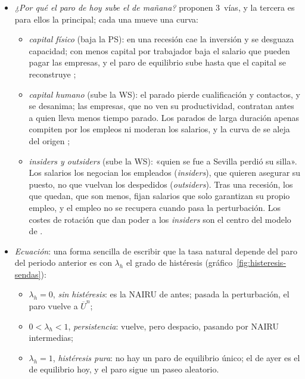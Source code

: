 \documentclass[11pt]{article}
\begin{document}
\begin{itemize}
\item \emph{¿Por qué el paro de hoy sube el de mañana?} \textcite{BlanchardSummers1986Hysteresis} proponen 3~vías, y la tercera es para ellos la principal; cada una mueve una curva:
  \begin{itemize}
  \item \emph{capital físico} (baja la PS): en una recesión cae la inversión y se desguaza capacidad; con menos capital por trabajador baja el salario que pueden pagar las empresas, y el paro de equilibrio sube hasta que el capital se reconstruye ;
  \item \emph{capital humano} (sube la WS): el parado pierde cualificación y contactos, y se desanima; las empresas, que no ven su productividad, contratan antes a quien lleva menos tiempo parado\nocite{BlanchardDiamond1994Ranking}. Los parados de larga duración apenas compiten por los empleos ni moderan los salarios, y la curva de  se aleja del origen ;
  \item \emph{insiders y outsiders} (sube la WS): «quien se fue a Sevilla perdió su silla». Los salarios los negocian los empleados (\emph{insiders}), que quieren asegurar su puesto, no que vuelvan los despedidos (\emph{outsiders}). Tras una recesión, los que quedan, que son menos, fijan salarios que solo garantizan su propio empleo, y el empleo no se recupera cuando pasa la perturbación. Los costes de rotación que dan poder a los \emph{insiders} son el centro del modelo de \textcite{LindbeckSnower1988Insider} .
  \end{itemize}
\item \emph{Ecuación}: una forma sencilla de escribir que la tasa natural depende del paro del periodo anterior es
  con $\lambda_h$ el grado de histéresis (gráfico~\ref{fig:histeresis-sendas}):
  \begin{itemize}
  \item $\lambda_h=0$, \emph{sin histéresis}: es la NAIRU de antes; pasada la perturbación, el paro vuelve a $\overline U^n$;
  \item $0<\lambda_h<1$, \emph{persistencia}: vuelve, pero despacio, pasando por NAIRU intermedias;
  \item $\lambda_h=1$, \emph{histéresis pura}: no hay un paro de equilibrio único; el de ayer es el de equilibrio hoy, y el paro sigue un paseo aleatorio.

\end{itemize}
\end{itemize}
\end{document}
